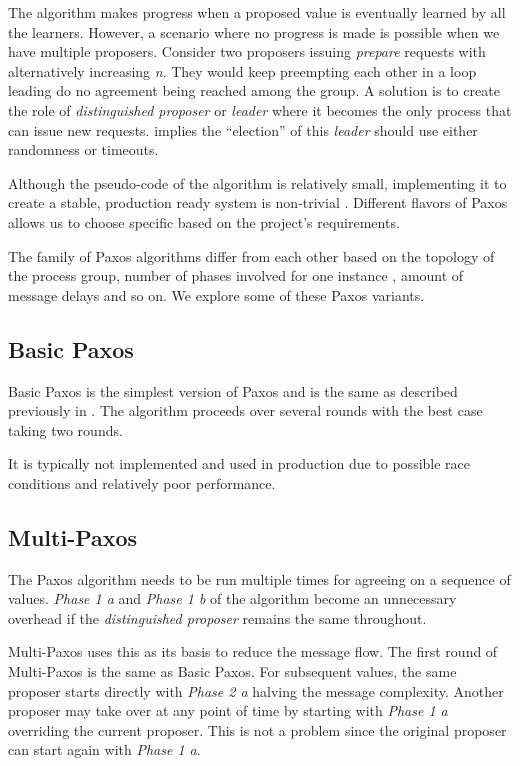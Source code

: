 The algorithm makes progress when a proposed value is eventually learned by all
the learners. However, a scenario where no progress is made is possible when we 
have multiple proposers. Consider two proposers issuing \emph{prepare} requests
with alternatively increasing \emph{n}. They would keep preempting each other
in a loop leading do no agreement being reached among the group. A solution is
to create the role of \emph{distinguished proposer} or \emph{leader} where it
becomes the only process that can issue new requests. \citet{FisLynPat85}
implies the ``election'' of this \emph{leader} should use either randomness
or timeouts.

Although the pseudo-code of the algorithm is relatively small, implementing it
to create a stable, production ready system is non-trivial \citep{ChandraGR07}.
Different flavors of Paxos allows us to choose specific based on the project's
requirements.

The family of Paxos algorithms differ from each other based on the topology
of the process group, number of phases involved for one instance%
, amount of message delays and so on. We explore some of these Paxos variants.

\subsection{Basic Paxos}

Basic Paxos is the simplest version of Paxos and is the same as described 
previously in . The algorithm proceeds over several rounds
with the best case taking two rounds.

It is typically not implemented and used in production due to possible race
conditions and relatively poor performance.

\subsection{Multi-Paxos}

The Paxos algorithm needs to be run multiple times for agreeing on a sequence of
values. \emph{Phase 1 a} and \emph{Phase 1 b} of the algorithm become 
an unnecessary overhead if the \emph{distinguished proposer} remains the same 
throughout.

Multi-Paxos uses this as its basis to reduce the message flow. The first round 
of Multi-Paxos is the same as Basic Paxos. For subsequent values, the same
proposer starts directly with \emph{Phase 2 a} halving the message complexity.
Another proposer may take over at any point of time by starting with 
\emph{Phase 1 a} overriding the current proposer. This is not a problem since 
the original proposer can start again with \emph{Phase 1 a}.

